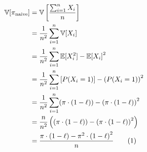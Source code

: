 \documentclass{article}
\newcommand{\stepandtag}{%
  \refstepcounter{equation}%
  \tag{\theequation}%
}
\begin{document}

\begin{align*}
    \mathbb{V}[\pi_{\text{naive}}] &= \mathbb{V}\left[ \frac{\sum_{i=1}^{n} X_i}{n} \right] \\
    &= \frac{1}{n^2} \sum_{i=1}^{n} \mathbb{V}[X_i] \\
    &= \frac{1}{n^2} \sum_{i=1}^{n} \mathbb{E}[X_i^2] - {\mathbb{E}[X_i]}^2 \\
    &= \frac{1}{n^2} \sum_{i=1}^{n} \left[ P(X_i = 1) \right] - {\left( P(X_i = 1) \right)}^2 \\
    &= \frac{1}{n^2} \sum_{i=1}^{n} (\pi \cdot (1-\ell)) - {(\pi \cdot (1-\ell))}^2 \\
    &= \frac{n}{n^2} \left( (\pi \cdot (1-\ell)) - {(\pi \cdot (1-\ell))}^2 \right) \\
    &= \frac{\pi \cdot (1-\ell) - \pi^2 \cdot {(1-\ell)}^2}{n} \stepandtag \label{eq:variance_naive_x_i}
\end{align*}
\end{document}
